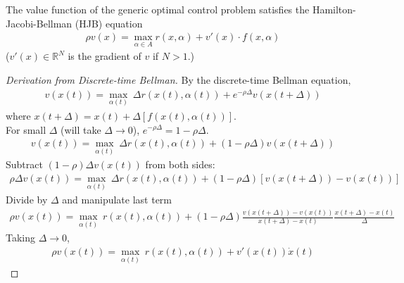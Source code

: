 \documentclass[11pt]{elegantbook}
\begin{document}
\begin{proposition}
    The value function of the generic optimal control problem satisfies the Hamilton-Jacobi-Bellman (HJB) equation
    \begin{equation}
        \begin{aligned}
            \rho v(x) = \max_{\alpha\in A} r(x,\alpha) + v'(x)\cdot f(x,\alpha)
        \end{aligned}
        \nonumber
    \end{equation}
    ($v'(x)\in \mathbb{R}^N$ is the gradient of $v$ if $N>1$.)
\end{proposition}
\begin{proof}[Derivation from Discrete-time Bellman]
    By the discrete-time Bellman equation,
    \begin{equation}
        \begin{aligned}
            v(x(t))=\max_{\alpha(t)}\ \Delta r(x(t),\alpha(t)) + e^{-\rho\Delta}v(x(t+\Delta))
        \end{aligned}
        \nonumber
    \end{equation}
    where $x(t+\Delta)=x(t)+\Delta [f(x(t),\alpha(t))]$.\\
    For small $\Delta$ (will take $\Delta \rightarrow 0$), $e^{-\rho\Delta}=1-\rho\Delta$.
    \begin{equation}
        \begin{aligned}
            v(x(t))=\max_{\alpha(t)}\ \Delta r(x(t),\alpha(t)) + (1-\rho\Delta)v(x(t+\Delta))
        \end{aligned}
        \nonumber
    \end{equation}
    Subtract $(1-\rho)\Delta v(x(t))$ from both sides:
    \begin{equation}
        \begin{aligned}
            \rho \Delta v(x(t))=\max_{\alpha(t)}\ \Delta r(x(t),\alpha(t)) + (1-\rho\Delta)[v(x(t+\Delta))-v(x(t))]
        \end{aligned}
        \nonumber
    \end{equation}
    Divide by $\Delta$ and manipulate last term
    \begin{equation}
        \begin{aligned}
            \rho v(x(t))=\max_{\alpha(t)}\ r(x(t),\alpha(t)) + (1-\rho\Delta)\frac{v(x(t+\Delta))-v(x(t))}{x(t+\Delta)-x(t)}\frac{x(t+\Delta)-x(t)}{\Delta}
        \end{aligned}
        \nonumber
    \end{equation}
    Taking $\Delta \rightarrow 0$,
    \begin{equation}
        \begin{aligned}
            \rho v(x(t))=\max_{\alpha(t)}\ r(x(t),\alpha(t)) + v'(x(t))\dot{x}(t)
        \end{aligned}
        \nonumber
    \end{equation}
\end{proof}
\end{document}
